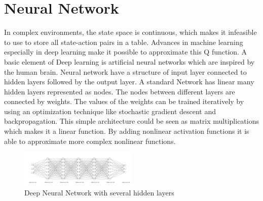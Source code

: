 \section{Neural Network}

In complex environments, the state space is continuous, which makes it infeasible to use to store all state-action pairs in a table.
Advances in machine learning especially in deep learning make it possible to approximate this Q function.  
A basic element of Deep learning is artificial neural networks which are inspired by the human brain.
Neural network have a structure of input layer connected to hidden layers followed by the output layer. 
A standard Network has linear many hidden layers represented as nodes. The nodes between different layers are connected by weights. 
The values of the weights can be trained iteratively by using an optimization  technique like stochastic gradient descent and backpropagation.
This simple architecture could be seen as matrix multiplications which makes it a linear function. 
By adding nonlinear activation functions it is able to approximate more complex nonlinear functions.


\begin{figure}[h]
  \centering
  \includegraphics[width=0.5\textwidth]{figures/background/nn.png}
  \caption{Deep Neural Network with several hidden layers}
  \label{fig:tab-training}
\end{figure}


